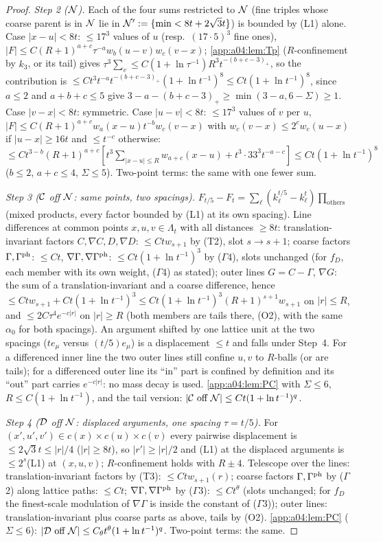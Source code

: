 \begin{proof}
\emph{Step 2 ($\mathcal N$).} Each of the four sums restricted to $\mathcal N$ (fine triples whose coarse parent is in $\mathcal N$ lie in $\mathcal N':=\{\min<8t+2\sqrt3t\}$) is bounded by (L1) alone. Case $|x-u|<8t$: $\le17^3$ values of $u$ (resp.\ $(17\cdot5)^3$ fine ones), $|F|\le C(R+1)^{a+c}\tau^{-a}w_b(u-v)w_c(v-x)$; \cref{app:a04:lem:Tp} ($R$-confinement by $k_3$, or its tail) gives $\tau^3\sum_v\le C(1+\ln\tau^{-1})R^3t^{-(b+c-3)_+}$, so the contribution is $\le Ct^3t^{-a}t^{-(b+c-3)_+}(1+\ln t^{-1})^{8}\le Ct(1+\ln t^{-1})^{8}$, since $a\le2$ and $a+b+c\le5$ give $3-a-(b+c-3)_+\ge\min(3-a,6-\Sigma)\ge1$. Case $|v-x|<8t$: symmetric. Case $|u-v|<8t$: $\le17^3$ values of $v$ per $u$, $|F|\le C(R+1)^{a+c}w_a(x-u)t^{-b}w_c(v-x)$ with $w_c(v-x)\le2^cw_c(u-x)$ if $|u-x|\ge16t$ and $\le t^{-c}$ otherwise: $\le Ct^{3-b}(R+1)^{a+c}[t^3\sum_{|x-u|\le R}w_{a+c}(x-u)+t^3\cdot33^3t^{-a-c}]\le Ct(1+\ln t^{-1})^{8}$ ($b\le2$, $a+c\le4$, $\Sigma\le5$). Two-point terms: the same with one fewer sum.

\emph{Step 3 ($\mathcal C$ off $\mathcal N$: same points, two spacings).} $F_{t/5}-F_t=\sum_\ell(k_\ell^{t/5}-k_\ell^t)\prod_{\text{others}}$ (mixed products, every factor bounded by (L1) at its own spacing). Line differences at common points $x,u,v\in\Lambda_t$ with all distances $\ge8t$: translation-invariant factors $C,\nabla C,D,\nabla D$: $\le Ctw_{s+1}$ by (T2), slot $s\to s+1$; coarse factors $\Gamma,\Gamma^{\mathrm{ph}}$: $\le Ct$, $\nabla\Gamma,\nabla\Gamma^{\mathrm{ph}}$: $\le Ct(1+\ln t^{-1})^3$ by ($\Gamma$4), slots unchanged (for $f_D$, each member with its own weight, ($\Gamma$4) as stated); outer lines $G=C-\Gamma$, $\nabla G$: the sum of a translation-invariant and a coarse difference, hence $\le Ctw_{s+1}+Ct(1+\ln t^{-1})^3\le Ct(1+\ln t^{-1})^3(R+1)^{s+1}w_{s+1}$ on $|r|\le R$, and $\le2C\tau^4e^{-c|r|}$ on $|r|\ge R$ (both members are tails there, (O2), with the same $\alpha_0$ for both spacings). An argument shifted by one lattice unit at the two spacings ($te_\mu$ versus $(t/5)e_\mu$) is a displacement $\le t$ and falls under Step~4. For a differenced inner line the two outer lines still confine $u,v$ to $R$-balls (or are tails); for a differenced outer line its ``in'' part is confined by definition and its ``out'' part carries $e^{-c|r|}$: no mass decay is used. \cref{app:a04:lem:PC} with $\Sigma\le6$, $R\le C(1+\ln t^{-1})$, and the tail version: $|\mathcal C\text{ off }\mathcal N|\le Ct(1+\ln t^{-1})^{q}$.

\emph{Step 4 ($\mathcal D$ off $\mathcal N$: displaced arguments, one spacing $\tau=t/5$).} For $(x',u',v')\in c(x)\times c(u)\times c(v)$ every pairwise displacement is $\le2\sqrt3t\le|r|/4$ ($|r|\ge8t$), so $|r'|\ge|r|/2$ and (L1) at the displaced arguments is $\le2^s$(L1) at $(x,u,v)$; $R$-confinement holds with $R\pm4$. Telescope over the lines: translation-invariant factors by (T3): $\le Ctw_{s+1}(r)$; coarse factors $\Gamma,\Gamma^{\mathrm{ph}}$ by ($\Gamma$2) along lattice paths: $\le Ct$; $\nabla\Gamma,\nabla\Gamma^{\mathrm{ph}}$ by ($\Gamma$3): $\le Ct^\theta$ (slots unchanged; for $f_D$ the finest-scale modulation of $\nabla\Gamma$ is inside the constant of ($\Gamma$3)); outer lines: translation-invariant plus coarse parts as above, tails by (O2). \cref{app:a04:lem:PC} ($\Sigma\le6$): $|\mathcal D\text{ off }\mathcal N|\le C_\theta t^\theta(1+\ln t^{-1})^{q}$. Two-point terms: the same.


\end{proof}
